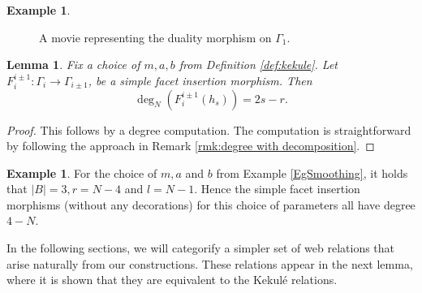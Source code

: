 \documentclass[12pt]{amsart}
\newtheorem{lemma}[theorem]{Lemma}
\theoremstyle{definition}
\newtheorem{example}[theorem]{Example}
\theoremstyle{remark}
\numberwithin{equation}{section}
\numberwithin{figure}{section}
\newcommand{\foamdeg}{\deg_N}
\begin{document}
\begin{example}
\begin{figure}[htbp]
{}
    \caption{A movie representing the duality morphism on $\Gamma_1$.}
    \label{fig:duality}
\end{figure}
\end{example}



\begin{lemma}\label{lem:deg compuation}
 Fix a choice of $m, a, b$ from Definition \ref{def:kekule}.  Let $F_i^{i\pm 1}:\Gamma_i\to\Gamma_{i\pm 1}$, be a simple facet insertion morphism. Then
  \[\foamdeg(F_i^{i\pm 1}(h_s))=2s-r.\]
  \label{DegreeLem}
\end{lemma}
\begin{proof}
    This follows by a degree computation. The computation is straightforward by following the approach in Remark \ref{rmk:degree with decomposition}.
\end{proof}

\begin{example}
    For the choice of $m,a$ and $b$ from Example \ref{EgSmoothing}, it holds that $|B| = 3, r = N - 4$ and $l = N - 1$. Hence the simple facet insertion morphisms (without any decorations) for this choice of parameters all have degree $4 - N$.
\end{example}

In the following sections, we will categorify a simpler set of web relations that arise naturally from our constructions. These relations appear in the next lemma, where it is shown that they are equivalent to the Kekulé relations. 
\end{document}
